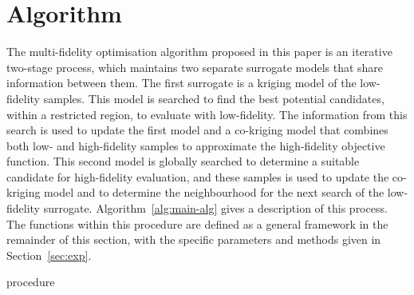 \section{\AlgName{} Algorithm}\label{sec:method}
The multi-fidelity optimisation algorithm proposed in this paper is an iterative two-stage process, which maintains two separate surrogate models that share information between them. The first surrogate is a kriging model of the low-fidelity samples. This model is searched to find the best potential candidates, within a restricted region, to evaluate with low-fidelity. The information from this search is used to update the first model and a co-kriging model that combines both low- and high-fidelity samples to approximate the high-fidelity objective function. This second model is globally searched to determine a suitable candidate for high-fidelity evaluation, and these samples is used to update the co-kriging model and to determine the neighbourhood for the next search of the low-fidelity surrogate. Algorithm~\ref{alg:main-alg} gives a description of this process. The functions within this procedure are defined as a general framework in the remainder of this section, with the specific parameters and methods given in Section~\ref{sec:exp}.

\begin{algorithm}[h!]
\caption{\AlgName{} procedure}
\label{alg:main-alg}
{\footnotesize 
\begin{algorithmic}[1]
 
 
  
   
   
   
   
   
   
   
   
     
  \ENDIF
\ENDWHILE
\end{algorithmic}
}
\end{algorithm}

